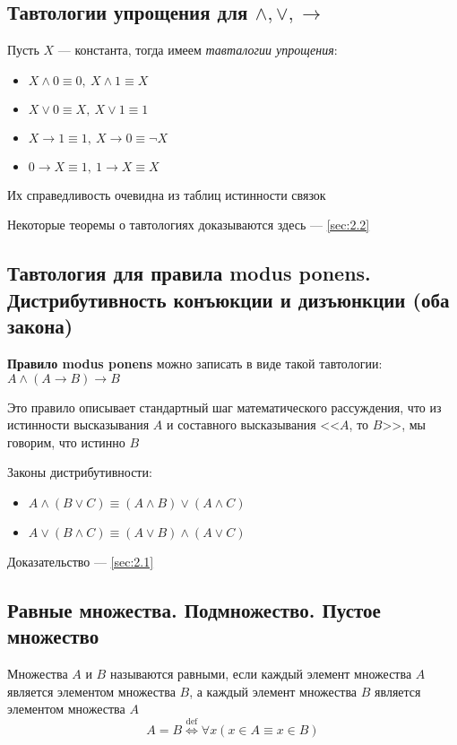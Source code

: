 \documentclass[a4paper]{article}
\begin{document}
\subsection{Тавтологии упрощения для $\wedge, \vee, \rightarrow$}
Пусть $X$ — константа, тогда имеем \textit{тавталогии упрощения}:
\begin{itemize}
    \item $X\wedge 0\equiv 0,\ X\wedge 1\equiv X$
    \item $X\vee 0\equiv X,\ X\vee 1\equiv 1$
    \item $X\rightarrow1\equiv1,\ X\rightarrow0\equiv\neg X$
    \item $0\rightarrow X\equiv1,\ 1\rightarrow X\equiv X$
\end{itemize}

Их справедливость очевидна из таблиц истинности связок

Некоторые теоремы о тавтологиях доказываются здесь — \ref{sec:2.2}


\subsection{Тавтология для правила modus ponens. Дистрибутивность конъюкции и дизъюнкции (оба закона)}
\textbf{Правило modus ponens} можно записать в виде такой тавтологии: $A\wedge (A\rightarrow B)\rightarrow B$

Это правило описывает стандартный шаг математического рассуждения, что из истинности высказывания $A$ и составного высказывания <<$A$, то $B$>>, мы говорим, что истинно $B$

Законы дистрибутивности:
\begin{itemize}
    \item $A\wedge(B\vee C)\equiv(A\wedge B)\vee(A\wedge C)$
    \item $A\vee(B\wedge C)\equiv(A\vee B)\wedge(A\vee C)$
\end{itemize}
Доказательство — \ref{sec:2.1}


\subsection{Равные множества. Подмножество. Пустое множество}
 Множества $A$ и $B$ называются равными, если каждый элемент множества $A$ является элементом множества $B$, а каждый элемент множества $B$ является элементом множества $A$
\begin{equation*}
    A=B \overset{\text{def}}{\Longleftrightarrow}\forall x(x\in A\equiv x\in B)
\end{equation*}
\end{document}
